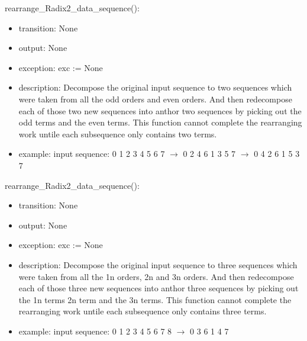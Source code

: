 \documentclass[12pt, titlepage]{article}
\begin{document}
rearrange\_Radix2\_data\_sequence():
\begin{itemize}
\item transition: None
\item output:  None
\item exception: exc := None
\item description: Decompose the original input sequence to two sequences which were taken from all the odd orders and even orders.
And then redecompose each of those two new sequences into anthor two sequences by picking out the odd terms and the even terms.
This function cannot complete the rearranging work untile each subsequence only contains two terms.
\item example: input sequence: 0 1 2 3 4 5 6 7 $\rightarrow$ 0 2 4 6 1 3 5 7 $\rightarrow$ 0 4 2 6 1 5 3 7
\end{itemize}
rearrange\_Radix2\_data\_sequence():
\begin{itemize}
\item transition: None
\item output:  None
\item exception: exc := None
\item description: Decompose the original input sequence to three sequences which were taken from all the 1n orders, 2n and 3n orders.
And then redecompose each of those three new sequences into anthor three sequences by picking out the 1n terms 2n term and the 3n terms.
This function cannot complete the rearranging work untile each subsequence only contains three terms.
\item example: input sequence: 0 1 2 3 4 5 6 7 8 $\rightarrow$ 0 3 6 1 4 7 
\end{itemize}
\end{document}
